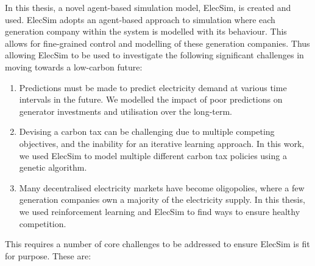 \documentclass[11pt]{report}
\begin{document}
In this thesis, a novel agent-based simulation model, ElecSim, is created and used. ElecSim adopts an agent-based approach to simulation where each generation company within the system is modelled with its behaviour. This allows for fine-grained control and modelling of these generation companies. Thus allowing ElecSim to be used to investigate the following significant challenges in moving towards a low-carbon future:
\begin{enumerate}
	\item Predictions must be made to predict electricity demand at various time intervals in the future. We modelled the impact of poor predictions on generator investments and utilisation over the long-term.
	\item Devising a carbon tax can be challenging due to multiple competing objectives, and the inability for an iterative learning approach. In this work, we used ElecSim to model multiple different carbon tax policies using a genetic algorithm.
	\item Many decentralised electricity markets have become oligopolies, where a few generation companies own a majority of the electricity supply. In this thesis, we used reinforcement learning and ElecSim to find ways to ensure healthy competition.
\end{enumerate}


This requires a number of core challenges to be addressed to ensure ElecSim is fit for purpose. These are:
\end{document}
